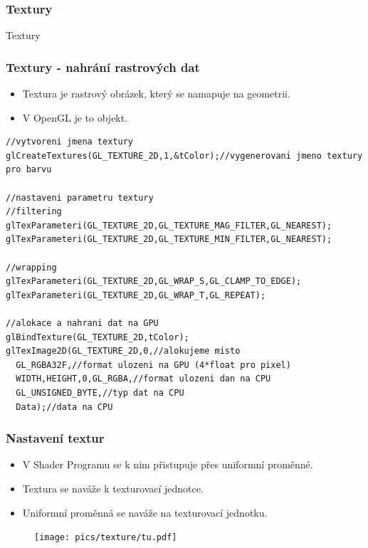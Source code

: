 \begin{frame}
\frametitle{Textury}
\begin{center}
\Huge {\color{white}Textury}
\end{center}
\end{frame}

\begin{frame}[fragile]
\frametitle{Textury - nahrání rastrových dat}
	\begin{itemize}
	\item Textura je rastrový obrázek, který se namapuje na geometrii.
	\item V OpenGL je to objekt.
\end{itemize}
{\scriptsize
\begin{verbatim}
//vytvoreni jmena textury
glCreateTextures(GL_TEXTURE_2D,1,&tColor);//vygenerovani jmeno textury pro barvu

//nastaveni parametru textury
//filtering
glTexParameteri(GL_TEXTURE_2D,GL_TEXTURE_MAG_FILTER,GL_NEAREST);
glTexParameteri(GL_TEXTURE_2D,GL_TEXTURE_MIN_FILTER,GL_NEAREST);

//wrapping
glTexParameteri(GL_TEXTURE_2D,GL_WRAP_S,GL_CLAMP_TO_EDGE);
glTexParameteri(GL_TEXTURE_2D,GL_WRAP_T,GL_REPEAT);

//alokace a nahrani dat na GPU
glBindTexture(GL_TEXTURE_2D,tColor);
glTexImage2D(GL_TEXTURE_2D,0,//alokujeme misto
  GL_RGBA32F,//format ulozeni na GPU (4*float pro pixel)
  WIDTH,HEIGHT,0,GL_RGBA,//format ulozeni dan na CPU
  GL_UNSIGNED_BYTE,//typ dat na CPU
  Data);//data na CPU
\end{verbatim}
}
\end{frame}

\begin{frame}[fragile]
\frametitle{Nastavení textur}
	\begin{itemize}
	\item V Shader Programu se k nim přistupuje přes uniformní proměnné.
	\item Textura se naváže k texturovací jednotce.
	\item Uniformní proměnná se naváže na texturovací jednotku.
	\end{itemize}
	\begin{figure}[h]
		\texttt{[image: pics/texture/tu.pdf]}
	\end{figure}
\end{frame}

